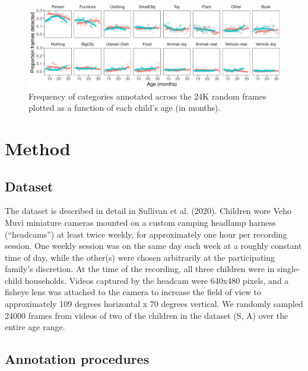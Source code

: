 \documentclass[10pt, letterpaper]{article}
\newenvironment{CodeChunk}{}{}
\begin{document}
\begin{CodeChunk}
\begin{figure}[h]

{\centering \includegraphics{figs/freq_by_category-1} 

}

\caption[Frequency of categories annotated across the 24K random frames plotted as a function of each child's age (in months)]{Frequency of categories annotated across the 24K random frames plotted as a function of each child's age (in months).}\label{fig:freq_by_category}
\end{figure}
\end{CodeChunk}

\hypertarget{method}{%
\section{Method}\label{method}}

\hypertarget{dataset}{%
\subsection{Dataset}\label{dataset}}

The dataset is described in detail in Sullivan et al. (2020). Children
wore Veho Muvi miniature cameras mounted on a custom camping headlamp
harness (``headcams'') at least twice weekly, for approximately one hour
per recording session. One weekly session was on the same day each week
at a roughly constant time of day, while the other(s) were chosen
arbitrarily at the participating family's discretion. At the time of the
recording, all three children were in single-child households. Videos
captured by the headcam were 640x480 pixels, and a fisheye lens was
attached to the camera to increase the field of view to approximately
109 degrees horizontal x 70 degrees vertical. We randomly sampled 24000
frames from videos of two of the children in the dataset (S, A) over the
entire age range.

\hypertarget{annotation-procedures}{%
\subsection{Annotation procedures}\label{annotation-procedures}}
\end{document}
